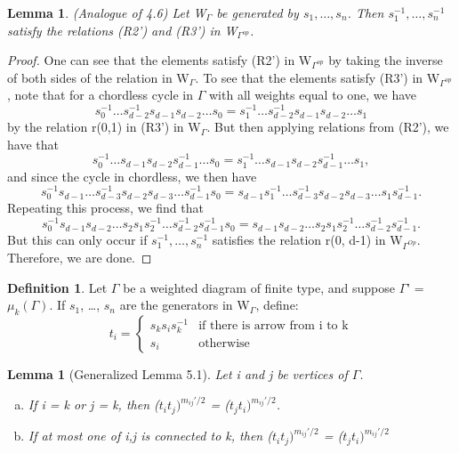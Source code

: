 \documentclass[11pt]{amsart}
\newtheorem{lem}[thm]{Lemma}
\theoremstyle{definition}
\newtheorem{defn}[thm]{Definition}
\begin{document}
\begin{lem} (Analogue of 4.6) 
Let W$_{\Gamma}$ be generated by $s_{1}, \dots, s_{n}$. Then $s_{1}^{-1}, \dots, s_{n}^{-1}$ satisfy the relations (R2') and (R3') in W$_{\Gamma^{op}}$.
\end{lem}
\begin{proof}
One can see that the elements satisfy (R2') in W$_{\Gamma^{op}}$ by taking the inverse of both sides of the relation in W$_{\Gamma}$. To see that the elements satisfy (R3') in W$_{\Gamma^{op}}$, note that for a chordless cycle in $\Gamma$ with all weights equal to one, we have $$s_{0}^{-1}\dots s_{d-2}^{-1}s_{d-1}s_{d-2}\dots s_{0} = s_{1}^{-1}\dots s_{d-2}^{-1}s_{d-1}s_{d-2}\dots s_{1}$$ by the relation r(0,1) in (R3') in W$_{\Gamma}$. But then applying relations from (R2'), we have that $$s_{0}^{-1}\dots s_{d-1}s_{d-2}s_{d-1}^{-1}\dots s_{0} = s_{1}^{-1}\dots s_{d-1}s_{d-2}s_{d-1}^{-1}\dots s_{1},$$ and since the cycle in chordless, we then have $$s_{0}^{-1}s_{d-1}\dots s_{d-3}^{-1}s_{d-2}s_{d-3}\dots s_{d-1}^{-1}s_{0} = s_{d-1}s_{1}^{-1}\dots s_{d-3}^{-1}s_{d-2}s_{d-3}\dots s_{1}s_{d-1}^{-1}.$$ Repeating this process, we find that $$s_{0}^{-1}s_{d-1}s_{d-2}\dots s_{2}s_{1}s_{2}^{-1}\dots s_{d-2}^{-1}s_{d-1}^{-1}s_{0} = s_{d-1}s_{d-2}\dots s_{2}s_{1}s_{2}^{-1}\dots s_{d-2}^{-1}s_{d-1}^{-1}.$$ But this can only occur if $s_{1}^{-1}, \dots, s_{n}^{-1}$ satisfies the relation r(0, d-1) in W$_{\Gamma^{Op}}.$ Therefore, we are done.
\end{proof}

\begin{defn} Let $\Gamma$ be a weighted diagram of finite type, and suppose $\Gamma$' = $\mu_{k}(\Gamma)$. If $s_1$, \dots, $s_n$ are the generators in W$_{\Gamma}$, define: 
$$t_{i} =
\begin{cases}
s_{k}s_{i}s_{k}^{-1} & \text{if there is arrow from i to k} \\
s_{i} & \text{otherwise}
\end{cases}$$
\end{defn}

\begin{lem}[Generalized Lemma 5.1]\label{lem:one_connected_to_k} Let i and j be vertices of $\Gamma$.
\begin{enumerate}[(a)]
\item If i = k or j = k, then ($t_{i}t_{j})^{m_{ij}'/2}$ = ($t_{j}t_{i})^{m_{ij}'/2}$.
\item If at most one of i,j is connected to k, then ($t_{i}t_{j})^{m_{ij}'/2}$ = ($t_{j}t_{i})^{m_{ij}'/2}$
\end{enumerate}
\end{lem}
\end{document}
